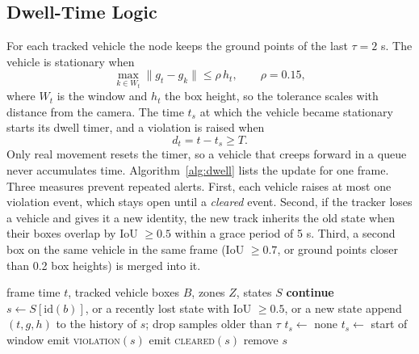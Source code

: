 \documentclass[conference]{IEEEtran}
\begin{document}
\subsection{Dwell-Time Logic}
For each tracked vehicle the node keeps the ground points of the last $\tau = 2$ s. The vehicle is stationary when
\begin{equation}
\max_{k \in W_t} \lVert g_t - g_k \rVert \leq \rho\, h_t, \qquad \rho = 0.15,
\label{eq:still}
\end{equation}
where $W_t$ is the window and $h_t$ the box height, so the tolerance scales with distance from the camera. The time $t_s$ at which the vehicle became stationary starts its dwell timer, and a violation is raised when
\begin{equation}
d_t = t - t_s \geq T .
\label{eq:dwell}
\end{equation}
Only real movement resets the timer, so a vehicle that creeps forward in a queue never accumulates time. Algorithm~\ref{alg:dwell} lists the update for one frame. Three measures prevent repeated alerts. First, each vehicle raises at most one violation event, which stays open until a \emph{cleared} event. Second, if the tracker loses a vehicle and gives it a new identity, the new track inherits the old state when their boxes overlap by IoU $\geq 0.5$ within a grace period of 5 s. Third, a second box on the same vehicle in the same frame (IoU $\geq 0.7$, or ground points closer than 0.2 box heights) is merged into it.

\begin{algorithm}[!t]
\caption{Dwell-time update for one analysed frame}
\label{alg:dwell}
\footnotesize
\begin{algorithmic}[1]
\Require frame time $t$, tracked vehicle boxes $B$, zones $Z$, states $S$
   \textbf{continue} \EndIf
  \State $s \gets S[\mathrm{id}(b)]$, or a recently lost state with IoU $\geq 0.5$, or a new state
  \State append $(t, g, h)$ to the history of $s$; drop samples older than $\tau$
   $t_s \gets$ none
   $t_s \gets$ start of window
  \EndIf
   emit \textsc{violation}$(s)$ \EndIf
\EndFor
{}
   emit \textsc{cleared}$(s)$ \EndIf
  \State remove $s$
\EndFor
\end{algorithmic}
\end{algorithm}
\end{document}
